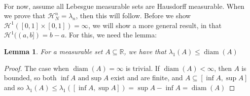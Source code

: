\documentclass{article}
\theoremstyle{plain}
\newtheorem{lem}[thm]{Lemma}
\theoremstyle{definition}
\DeclareMathOperator{\diam}{diam}
\theoremstyle{remark}
\begin{document}

~\\ For now, assume all Lebesgue measurable sets are Hausdorff measurable. When we prove that $\mathcal{H}^n_N = \lambda _n$, then this will follow. Before we show $\mathcal{H}^1([0,1]\times [0,1])=\infty$, we will show a more general result, in that $\mathcal{H}^1((a,b]) = b-a$. For this, we need the lemma:

\begin{lem}
    For a measurable set $A \subseteq \mathbb{R}$, we have that $\lambda_1 (A) \le \diam (A)$
\end{lem}

\begin{proof}
    The case when $\diam (A)=\infty$ is trivial. If $\diam (A) < \infty$, then $A$ 
 is bounded, so both $\inf A \text{ and} \sup A$ exist and are finite, and $A \subseteq \left[\inf \limits A, \sup \limits A \right]$ and so $\lambda_1 (A) \le \lambda_1 \left(\left[\inf \limits A, \sup A\right]\right) = \sup \limits A - \inf \limits A = \diam (A)$
\end{proof}
\end{document}
